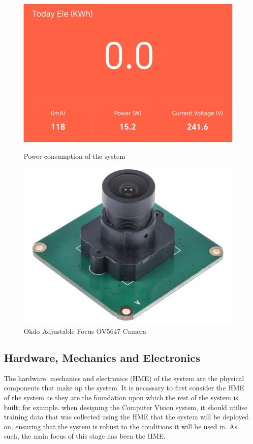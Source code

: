 \begin{figure}[t]
\begin{minipage}[t]{0.22\textwidth}
      \includegraphics[width=\textwidth]{imgs/powermeter.png}
      \caption{Power consumption of the system}
  \end{minipage}
  \hfill
  \begin{minipage}[t]{0.22\textwidth}
    \centering
    \includegraphics[width=\textwidth]{imgs/okdo_camera.jpg}
    \caption{Okdo Adjustable Focus OV5647 Camera\cite{okdocamera}}
  \end{minipage}
\end{figure}

\subsection{Hardware, Mechanics and Electronics}
The hardware, mechanics and electronics (HME) of the system are the physical components that make up the system.
It is necassary to first consider the HME of the system as they are the foundation upon which the rest of the system is built;
for example, when designing the Computer Vision system, it should utilise training data that was collected using the HME 
that the system will be deployed on, ensuring that the system is robust to the conditions it will be used in. As such,
the main focus of this stage has been the HME.

